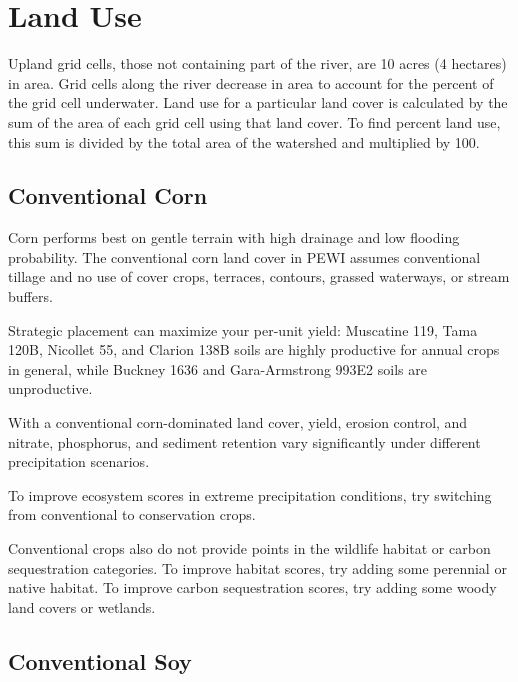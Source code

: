 \documentclass[11pt]{article}
\begin{document}
\tableofcontents
\thispagestyle{empty} %
\cleardoublepage %

\setcounter{page}{1}


\section{Land Use}\label{sec:landuse}
Upland grid cells, those not containing part of the river, are 10 acres (4 hectares) in area. Grid cells along the river decrease in area to account for the percent of the grid cell underwater. Land use for a particular land cover is calculated by the sum of the area of each grid cell using that land cover. To find percent land use, this sum is divided by the total area of the watershed and multiplied by 100.

\subsection{Conventional Corn}

Corn performs best on gentle terrain with high drainage and low flooding probability. The conventional corn land cover in PEWI assumes conventional tillage and no use of cover crops, terraces, contours, grassed waterways, or stream buffers.

Strategic placement can maximize your per-unit yield: Muscatine 119, Tama 120B, Nicollet 55, and Clarion 138B soils are highly productive for annual crops in general, while Buckney 1636 and Gara-Armstrong 993E2 soils are unproductive.
 
With a conventional corn-dominated land cover, yield, erosion control, and nitrate, phosphorus, and sediment retention vary significantly under different precipitation scenarios. 

To improve ecosystem scores in extreme precipitation conditions, try switching from conventional to conservation crops.

Conventional crops also do not provide points in the wildlife habitat or carbon sequestration categories. To improve habitat scores, try adding some perennial or native habitat. To improve carbon sequestration scores, try adding some woody land covers or wetlands.


\subsection{Conventional Soy}
\end{document}
